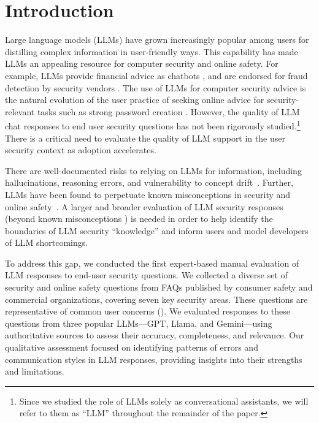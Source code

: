 
\section{Introduction}
\label{sec:intro}


Large language models (LLMs) have grown increasingly popular among users for distilling complex information in user-friendly ways. This capability has made LLMs an appealing resource for computer security and online safety. For example, LLMs provide financial advice as chatbots \cite{next_web}, and are endorsed for fraud detection by security vendors \cite{zdnet_norton, biocatch, dataleon}. The use of LLMs for computer security advice is the natural evolution of the user practice of seeking online advice for security-relevant tasks such as strong password creation \cite{redmiles-2016-sources-n-selection}. However, the quality of LLM chat responses to end user security questions has not been rigorously studied.\footnote{Since we studied the role of LLMs solely as conversational assistants, we will refer to them as ``LLM'' throughout the remainder of the paper.} There is a critical need to evaluate the quality of LLM support in the user security context as adoption accelerates.






There are well-documented risks to relying on LLMs for information, including hallucinations, reasoning errors,
and vulnerability to concept drift~\cite{openai2024gpt4, GPT4SystemCard, geminiteam2024geminiv1, brown2020language, rajani-etal-2019-explain, shwartz-etal-2020-unsupervised, Lu_2018, bommasani2022opportunitiesrisksfoundationmodels}. Further, LLMs have been found to perpetuate known misconceptions in security and online safety~\cite{chen2023can}. A larger and broader evaluation of LLM security responses (beyond known misconceptions \cite{chen2023can}) is needed in order to help identify the boundaries of LLM security ``knowledge” and inform users and model developers of LLM shortcomings.%



To address this gap, we conducted the first expert-based manual evaluation of LLM responses to end-user security questions. We collected a diverse set of security and online safety questions from FAQs published by consumer safety and commercial organizations, covering seven key security areas. These questions are representative of common user concerns (). We evaluated responses to these questions from three popular LLMs---GPT, Llama, and Gemini---using authoritative sources to assess their accuracy, completeness, and relevance. Our qualitative assessment focused on identifying patterns of errors and communication styles in LLM responses, providing insights into their strengths and limitations.






